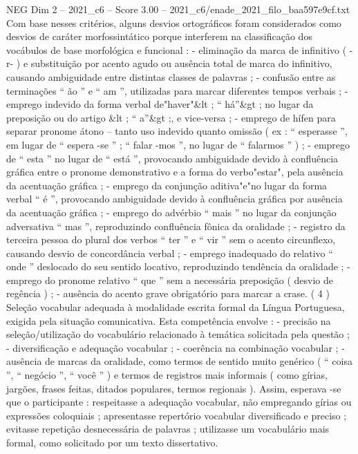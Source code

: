 \begin{textsample}{NEG Dim 2 – 2021\_c6 – Score 3.00 – 2021\_c6/enade\_2021\_filo\_baa597e9cf.txt}
Com base nesses critérios, alguns desvios ortográficos foram considerados como desvios de caráter morfossintático porque interferem na classificação dos vocábulos de base morfológica e funcional : - eliminação da marca de infinitivo ( -r- ) e substituição por acento agudo ou ausência total de marca do infinitivo, causando ambiguidade entre distintas classes de palavras ; - confusão entre as terminações “ ão ” e “ am ”, utilizadas para marcar diferentes tempos verbais ; - emprego indevido da forma verbal de"haver"\&lt ; “ há”\&gt ; no lugar da preposição ou do artigo \&lt ; “ a”\&gt ;, e vice-versa ; - emprego de hífen para separar pronome átono – tanto uso indevido quanto omissão ( ex : “ esperasse ”, em lugar de “ espera -se ” ; “ falar -mos ”, no lugar de “ falarmos ” ) ; - emprego de “ esta ” no lugar de “ está ”, provocando ambiguidade devido à confluência gráfica entre o pronome demonstrativo e a forma do verbo"estar", pela ausência da acentuação gráfica ; - emprego da conjunção aditiva"e"no lugar da forma verbal “ é ”, provocando ambiguidade devido à confluência gráfica por ausência da acentuação gráfica ; - emprego do advérbio “ mais ” no lugar da conjunção adversativa “ mas ”, reproduzindo confluência fônica da oralidade ; - registro da terceira pessoa do plural dos verbos “ ter ” e “ vir ” sem o acento circunflexo, causando desvio de concordância verbal ; - emprego inadequado do relativo “ onde ” deslocado do seu sentido locativo, reproduzindo tendência da oralidade ; - emprego do pronome relativo “ que ” sem a necessária preposição ( desvio de regência ) ; - ausência do acento grave obrigatório para marcar a crase. ( 4 ) Seleção vocabular adequada à modalidade escrita formal da Língua Portuguesa, exigida pela situação comunicativa.
Esta competência envolve : - precisão na seleção/utilização do vocabulário relacionado à temática solicitada pela questão ; - diversificação e adequação vocabular ; - coerência na combinação vocabular ; - ausência de marcas da oralidade, como termos de sentido muito genérico ( “ coisa ”, “ negócio ”, “ você ” ) e termos de registros mais informais ( como gírias, jargões, frases feitas, ditados populares, termos regionais ).
Assim, esperava -se que o participante : respeitasse a adequação vocabular, não empregando gírias ou expressões coloquiais ; apresentasse repertório vocabular diversificado e preciso ; evitasse repetição desnecessária de palavras ; utilizasse um vocabulário mais formal, como solicitado por um texto dissertativo.

\end{textsample}
